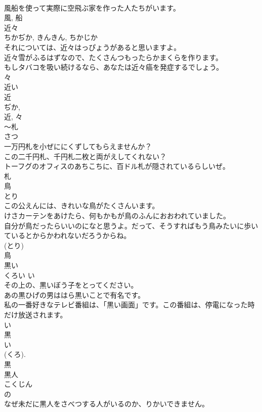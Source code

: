 \documentclass[8pt]{extreport}
\begin{document}
\begin{CJK}{UTF8}{min}
\\	風船を使って実際に空飛ぶ家を作った人たちがいます。	
\\	風, 船	
\\	近々	
\\	ちかぢか, きんきん, ちかじか	
\\	それについては、近々はっぴょうがあると思いますよ。	
\\	近々雪がふるはずなので、たくさんつもったらかまくらを作ります。	
\\	もしタバコを吸い続けるなら、あなたは近々癌を発症するでしょう。	
\\	々 
\\	近い 
\\	近 
\\	ぢか, 
\\	近, 々	
\\	〜札	
\\	さつ	
\\	一万円札を小ぜににくずしてもらえませんか？	
\\	この二千円札、千円札二枚と両がえしてくれない？	
\\	トーフグのオフィスのあちこちに、百ドル札が隠されているらしいぜ。	
\\	札	
\\	鳥	
\\	とり	
\\	この公えんには、きれいな鳥がたくさんいます。	
\\	けさカーテンをあけたら、何もかもが鳥のふんにおおわれていました。	
\\	自分が鳥だったらいいのになと思うよ。だって、そうすればもう鳥みたいに歩いているとからかわれないだろうからね。	
\\	(とり) 
\\	鳥	
\\	黒い	
\\	くろい	い 
\\	その上の、黒いぼう子をとってください。	
\\	あの黒ひげの男ははら黒いことで有名です。	
\\	私の一番好きなテレビ番組は、「黒い画面」です。この番組は、停電になった時だけ放送されます。	
\\	い 
\\	黒 
\\	い 
\\	(くろ). 
\\	黒	
\\	黒人	
\\	こくじん	
\\	の 
\\	なぜ未だに黒人をさべつする人がいるのか、りかいできません。	

\end{CJK}
\end{document}
